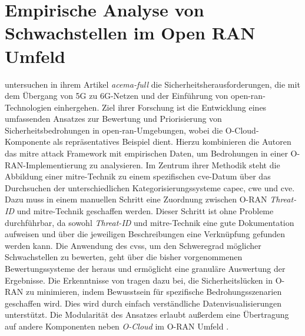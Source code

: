 \section{Empirische Analyse von Schwachstellen im Open RAN Umfeld}
\label{sec:forschungsstand-acema}
\citeauthor{klementSecuring6GTransition2024} untersuchen in ihrem Artikel \textit{\gls{acema-full}} die Sicherheitsherausforderungen, die mit dem Übergang von 5G zu 6G-Netzen und der Einführung von \gls{open-ran}-Technologien einhergehen. Ziel ihrer Forschung ist die Entwicklung eines umfassenden Ansatzes zur Bewertung und Priorisierung von Sicherheitsbedrohungen in \gls{open-ran}-Umgebungen, wobei die O-Cloud-Komponente als repräsentatives Beispiel dient. Hierzu kombinieren die Autoren das \gls{mitre} \gls{attack} Framework mit empirischen Daten, um Bedrohungen in einer O-RAN-Implementierung zu analysieren. Im Zentrum ihrer Methodik steht die Abbildung einer \gls{mitre}-Technik zu einem spezifischen \gls{cve}-Datum über das Durchsuchen der unterschiedlichen Kategorisierungssysteme \gls{capec}, \gls{cwe} und \gls{cve}. Dazu muss in einem manuellen Schritt eine Zuordnung zwischen O-RAN \textit{Threat-ID} und \gls{mitre}-Technik geschaffen werden. Dieser Schritt ist ohne Probleme durchführbar, da sowohl \textit{Threat-ID} und \gls{mitre}-Technik eine gute Dokumentation aufweisen und über die jeweiligen Beschreibungen eine Verknüpfung gefunden werden kann. Die Anwendung des \gls{cvss}, um den Schweregrad möglicher Schwachstellen zu bewerten, geht über die bisher vorgenommenen Bewertungssysteme der \orana heraus und ermöglicht eine granuläre Auswertung der Ergebnisse. Die Erkenntnisse von \citeauthor{klementSecuring6GTransition2024} tragen dazu bei, die Sicherheitslücken in O-RAN zu minimieren, indem Bewusstsein für spezifische Bedrohungsszenarien geschaffen wird. Dies wird durch einfach verständliche Datenvisualisierungen unterstützt. Die Modularität des Ansatzes erlaubt außerdem eine Übertragung auf andere Komponenten neben \textit{O-Cloud} im O-RAN Umfeld \autocite{klementSecuring6GTransition2024}.

%
